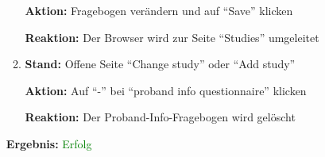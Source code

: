 \documentclass[a4paper]{scrreprt}
\begin{document}
\begin{itemize}
\begin{enumerate}
                              \par \textbf{Aktion: }Fragebogen ver\"andern und auf ``Save'' klicken
                              \par \textbf{Reaktion: }Der Browser wird zur Seite ``Studies'' umgeleitet               
                        \item \par \textbf{Stand: }Offene Seite ``Change study'' oder ``Add study''
                              \par \textbf{Aktion: }Auf ``-'' bei ``proband info questionnaire'' klicken
                              \par \textbf{Reaktion: }Der Proband-Info-Fragebogen wird gel\"oscht                                                                           
                    \end{enumerate}
					\vspace*{0.3cm}
		           \par \textbf{Ergebnis: }\textcolor{green}{Erfolg}
		           \vspace*{0.6cm}  	
		           

\end{itemize}
\end{document}
